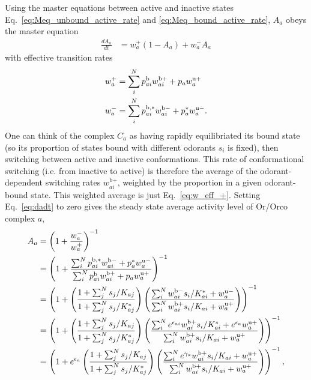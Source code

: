 \documentclass[9pt,twoside]{pnas-new}
\begin{document}
Using the master equations between active and inactive states Eq.~\ref{eq:Meq_unbound_active_rate} and \ref{eq:Meq_bound_active_rate}, $A_a$  obeys the master equation 
\begin{align}
\frac{dA_a}{dt} &= w^+_a(1 - A_a) + w^-_aA_a
\label{eq:dadt}
\end{align}
with effective transition rates
\begin{align}
w^+_a &= \sum_i^Np^{\text b}_{ai} w^{\text b +}_{ai} + p_{a}w^{\text u +}_a \label{eq:w_eff_+} \\
w^-_a &= \sum_i^Np^{\text b, *}_{ai} w^{\text b -}_{ai} + p^*_{a}w^{\text u -}_a.
\label{eq:w_eff_-}
\end{align}
One can think of the complex $C_a$ as having rapidly equilibriated its bound state (so its proportion of states bound with different odorants $s_i$ is fixed), then switching between active and inactive conformations. This rate of conformational switching (i.e. from inactive to active) is therefore the average of the odorant-dependent switching rates ${w^{\text{b}+}_{ai}}$, weighted by the proportion in a given odorant-bound state. This weighted average is just Eq.~\ref{eq:w_eff_+}. Setting Eq.~\ref{eq:dadt} to zero gives the steady state average activity level of Or/Orco complex $a$, 
\begin{align}
A_a &= \left(1 + \frac{w^-_a}{w^+_a}\right)^{-1}
\nonumber \\
&= \left(1 + \frac{\sum_i^Np^{\text b, *}_{ai} w^{\text b -}_{ai} + p^*_{a}w^{\text u -}_a}{\sum_i^Np^{\text b}_{ai} w^{\text b +}_{ai} + p_{a}w^{\text u +}_a}\right)^{-1}
\nonumber \\
&= \left(1 + \left(\frac{1 + \sum_j^Ns_j/K_{aj}}{1 + \sum_j^Ns_j/K^*_{aj}}\right)\left(\frac{\sum_i^N w_{ai}^{\textup b -} s_i/K^*_{ai} + w_a^{\textup u -}}{\sum_i^N w_{ai}^{\textup b +} s_i/K_{ai} + w_a^{\textup u +}}\right)\right)^{-1} \nonumber \\
&= \left(1 + \left(\frac{1 + \sum_j^Ns_j/K_{aj}}{1 + \sum_j^Ns_j/K^*_{aj}}\right)\left(\frac{\sum_i^N e^{\epsilon_{ai}}w_{ai}^{\textup b +} s_i/K^*_{ai} + e^{\epsilon_{a}}w_a^{\textup u +}}{\sum_i^N w_{ai}^{\textup b +} s_i/K_{ai} + w_a^{\textup u +}}\right)\right)^{-1} \nonumber \\
&= \left
(1 + e^{\epsilon_a}\left(\frac{1 + \sum_j^Ns_j/K_{aj}}{1 + \sum_j^Ns_j/K^*_{aj}}
\right)
\left(
\frac{\sum_i^N e^{\gamma_a}w_{ai}^{\textup b +} s_i/K_{ai} + w_a^{\textup u +}}{\sum_i^N w_{ai}^{\textup b +} s_i/K_{ai} + w_a^{\textup u +}}
\right)
\right)^{-1}, \nonumber 
\end{align}
\end{document}
